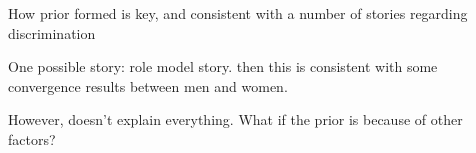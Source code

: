\documentclass[10 pt]{article}
\newcommand{\nobib}[1]{}
\newcommand{\nobib}[1]{#1}
\begin{document}
{\begin{blist}
\item How prior formed is key, and consistent with a number of stories regarding discrimination

\item One possible story: role model story. then this is consistent with some convergence results between men and women.

\item However, doesn't explain everything. What if the prior is because of other factors?

\end{blist}








} %


\nobib{\printbibliography}
\end{document}
